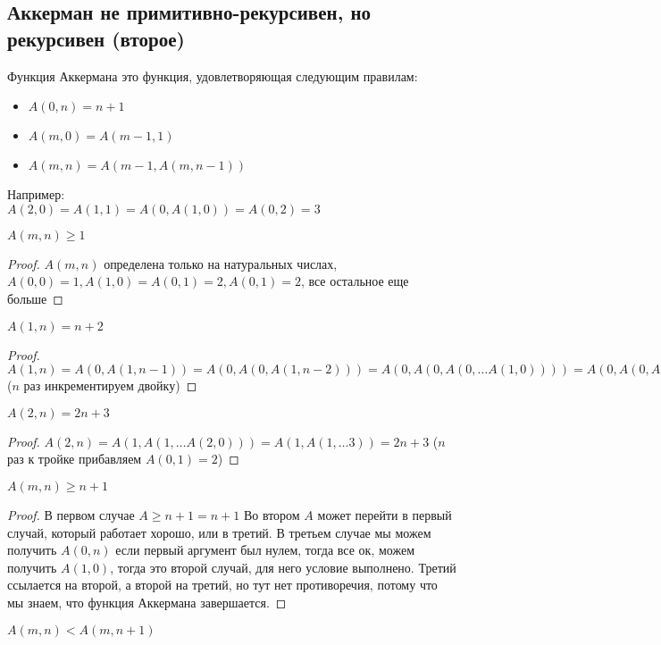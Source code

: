 \subsection{Аккерман не примитивно-рекурсивен, но рекурсивен (второе)}
\label{sec-10-3}
Функция Аккермана это функция, удовлетворяющая следующим правилам:\\
\begin{itemize}
\item $A(0, n) = n + 1$
\item $A(m, 0) = A(m - 1, 1)$
\item $A(m, n) = A(m - 1, A(m, n - 1))$
\end{itemize}
Например:\\
$A(2, 0) = A(1, 1) = A(0, A(1, 0)) = A(0, 2) = 3$
\begin{lemma}
$A(m, n) \geq 1$
\end{lemma}
\begin{proof}
$A(m, n)$ определена только на натуральных числах,
$A(0, 0) = 1, A(1, 0) = A(0, 1) = 2, A(0, 1) = 2$,
все остальное еще больше
\end{proof}
\begin{lemma}
$A(1, n) = n + 2$
\end{lemma}
\begin{proof}
$A(1, n)
= A(0, A(1, n - 1))
= A(0, A(0, A(1, n - 2)))
= A(0, A(0, A(0, \ldots{} A(1, 0))))
= A(0, A(0, A(0, \ldots{} 2)))
= n + 2$ ($n$ раз инкрементируем двойку)
\end{proof}
\begin{lemma}
$A(2, n) = 2n + 3$
\end{lemma}
\begin{proof}
$A(2, n)
= A(1, A(1, \ldots{} A(2, 0)))
= A(1, A(1, \ldots{} 3))
= 2n + 3$ ($n$ раз к тройке прибавляем $A(0, 1) = 2$)
\end{proof}
\begin{lemma}
$A(m, n) \geq n + 1$
\end{lemma}
\begin{proof}
В первом случае $A \geq n + 1 = n + 1$
Во втором $A$ может перейти в первый случай, который работает
хорошо, или в третий.
В третьем случае мы можем получить $A(0, n)$ если первый аргумент
был нулем, тогда все ок, можем получить $A(1, 0)$, тогда это второй
случай, для него условие выполнено.
Третий ссылается на второй, а второй на третий, но тут
нет противоречия, потому что мы знаем, что функция Аккермана
завершается.
\end{proof}
\begin{lemma}
$A(m, n) < A(m, n + 1)$
\end{lemma}
